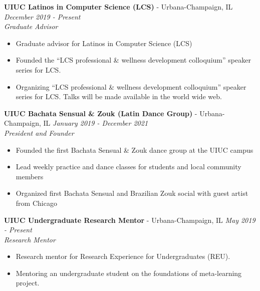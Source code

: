 \documentclass{article}
\newenvironment{changemargin}[2]{%
  \begin{list}{}{%
    \setlength{\topsep}{0pt}%
    \setlength{\leftmargin}{#1}%
    \setlength{\rightmargin}{#2}%
    \setlength{\listparindent}{\parindent}%
    \setlength{\itemindent}{\parindent}%
    \setlength{\parsep}{\parskip}%
  }%
  \item[]}{\end{list}
}
\newenvironment{body} {
	\vspace*{-16pt}
	\begin{changemargin}{-0.25in}{-0.5in}
  }	
	{\end{changemargin}
}
\begin{document}
\begin{body}
    \textbf{UIUC Latinos in Computer Science (LCS)} - Urbana-Champaign, IL \hfill \emph{December 2019 - Present}\\
	\emph{Graduate Advisor}\\
	\vspace*{-3pt}
	\begin{itemize} \itemsep -2pt  %
    	\item Graduate advisor for Latinos in Computer Science (LCS)
    	\item Founded the ``LCS professional \& wellness development colloquium'' speaker series for LCS.
    	\item Organizing ``LCS professional \& wellness development colloquium'' speaker series for LCS.
    	Talks will be made available in the world wide web.
	\end{itemize}
	\vspace{5 pt}
	
	\textbf{UIUC Bachata Sensual \& Zouk (Latin Dance Group)} - Urbana-Champaign, IL \hfill \emph{January 2019 - December 2021}\\
	\emph{President and Founder}\\
	\vspace*{-3pt}
	\begin{itemize} \itemsep -2pt  %
    	\item Founded the first Bachata Sensual \& Zouk dance group at the UIUC campus
    	\item Lead weekly practice and dance classes for students and local community members
    	\item Organized first Bachata Sensual and Brazilian Zouk social with guest artist from Chicago
	\end{itemize}
	\vspace{5 pt}
	
	\textbf{UIUC Undergraduate Research Mentor} - Urbana-Champaign, IL \hfill \emph{May 2019 - Present}\\
	\emph{Research Mentor}\\
	\vspace*{-3pt}
	\begin{itemize} \itemsep -2pt  %
    	\item Research mentor for Research Experience for Undergraduates (REU).
    	\item Mentoring an undergraduate student on the foundations of meta-learning project.
	\end{itemize}
	\vspace{5 pt}
	

\end{body}
\end{document}
